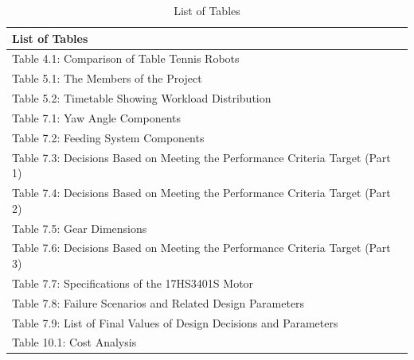 \documentclass[12pt]{report}
\begin{document}
\begin{table}[h!]
\centering
\begin{tabular}{|p{15cm}|}
\hline
\textbf{List of Tables} \\ \hline
Table 4.1: Comparison of Table Tennis Robots \\ \hline
Table 5.1: The Members of the Project \\ \hline
Table 5.2: Timetable Showing Workload Distribution \\ \hline
Table 7.1: Yaw Angle Components \\ \hline
Table 7.2: Feeding System Components \\ \hline
Table 7.3: Decisions Based on Meeting the Performance Criteria Target (Part 1) \\ \hline
Table 7.4: Decisions Based on Meeting the Performance Criteria Target (Part 2) \\ \hline
Table 7.5: Gear Dimensions \\ \hline
Table 7.6: Decisions Based on Meeting the Performance Criteria Target (Part 3) \\ \hline
Table 7.7: Specifications of the 17HS3401S Motor \\ \hline
Table 7.8: Failure Scenarios and Related Design Parameters \\ \hline
Table 7.9: List of Final Values of Design Decisions and Parameters\\ \hline
Table 10.1: Cost Analysis \\ \hline
\end{tabular}
\caption{List of Tables}
\label{tab:list_of_tables}
\end{table}
\end{document}
